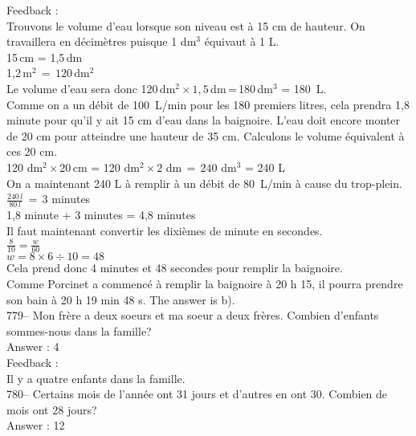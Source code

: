 \documentclass[letterpaper, 12pt]{article}
\begin{document}
Feedback : \\
Trouvons le volume d'eau lorsque son niveau est \`a 15 cm de hauteur. On
travaillera en d\'ecim\`etres puisque 1 dm$^{3}$ \'equivaut \`a 1 L.\\
15\,cm = 1,5\,dm\\
1,2\,m$^{2}\,=\,120$\,dm$^{2}$\\
Le volume d'eau sera donc 120\,dm$^{2}\times1,5$\,dm\,=\,180\,dm$^{3}$ =
180~L.\\

Comme on a un d\'ebit de 100~L/min pour les 180 premiers litres,  cela
prendra 1,8 minute pour qu'il y ait 15 cm d'eau dans la baignoire. L'eau
doit encore monter de 20 cm pour atteindre une hauteur de 35 cm. Calculons
le volume \'equivalent \`a ces 20 cm.\\

120 dm$^{2}\times 20$\,cm = 120 dm$^{2}\times 2$ dm$\,=\,240$ dm$^{3}$ = 240
L\\[2mm]
On a maintenant 240 L \`a remplir \`a un d\'ebit de 80~L/min \`a cause du
trop-plein.\\[2mm]
$\frac{240\,l}{80\,l}\,=\,3$ minutes\\[2mm]
1,8 minute + 3 minutes = 4,8 minutes\\[2mm]
Il faut maintenant convertir les dixi\`emes de minute en secondes.\\[2mm]
$\frac{8}{10}=\frac{w}{60}$\\[2mm]
$w=8\times6\div10=48$\\[2mm]
Cela prend donc 4 minutes et 48 secondes pour remplir la
baignoire.\\[2mm]
Comme Porcinet a commenc\'e \`a remplir la baignoire \`a 20 h 15, il pourra
prendre son bain \`a 20 h 19 min 48 s.  The answer is b).\\

779-- Mon fr\`ere a deux soeurs et ma soeur a deux fr\`eres.  Combien
d'enfants sommes-nous dans la famille?\\

Answer : 4\\

Feedback : \\
Il y a quatre enfants dans la famille.\\

780-- Certains mois de l'ann\'ee ont 31 jours et d'autres en ont 30.
Combien de mois ont 28 jours?\\

Answer : 12\\
\end{document}
